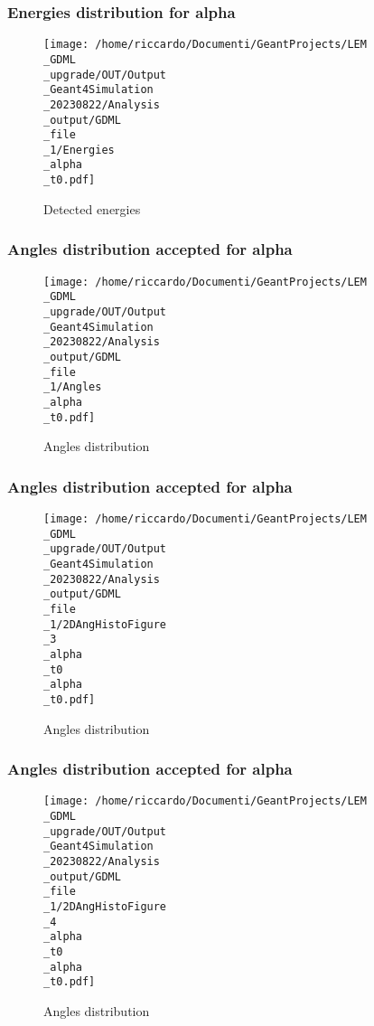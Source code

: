 \documentclass[8pt]{beamer}
\begin{document}
            \begin{frame}
                \frametitle{Energies distribution for alpha}
            
        \begin{figure}[h]
            \centering
            \texttt{[image: /home/riccardo/Documenti/GeantProjects/LEM\\\_GDML\\\_upgrade/OUT/Output\\\_Geant4Simulation\\\_20230822/Analysis\\\_output/GDML\\\_file\\\_1/Energies\\\_alpha\\\_t0.pdf]}
            \caption{Detected energies}
        \end{figure}
        
            \end{frame}
            
            \begin{frame}
                \frametitle{Angles distribution accepted for alpha}
            
        \begin{figure}[h]
            \centering
            \texttt{[image: /home/riccardo/Documenti/GeantProjects/LEM\\\_GDML\\\_upgrade/OUT/Output\\\_Geant4Simulation\\\_20230822/Analysis\\\_output/GDML\\\_file\\\_1/Angles\\\_alpha\\\_t0.pdf]}
            \caption{Angles distribution}
        \end{figure}
        
            \end{frame}
            
            \begin{frame}
                \frametitle{Angles distribution accepted for alpha}
            
        \begin{figure}[h]
            \centering
            \texttt{[image: /home/riccardo/Documenti/GeantProjects/LEM\\\_GDML\\\_upgrade/OUT/Output\\\_Geant4Simulation\\\_20230822/Analysis\\\_output/GDML\\\_file\\\_1/2DAngHistoFigure\\\_3\\\_alpha\\\_t0\\\_alpha\\\_t0.pdf]}
            \caption{Angles distribution}
        \end{figure}
        
            \end{frame}
            
            \begin{frame}
                \frametitle{Angles distribution accepted for alpha}
            
        \begin{figure}[h]
            \centering
            \texttt{[image: /home/riccardo/Documenti/GeantProjects/LEM\\\_GDML\\\_upgrade/OUT/Output\\\_Geant4Simulation\\\_20230822/Analysis\\\_output/GDML\\\_file\\\_1/2DAngHistoFigure\\\_4\\\_alpha\\\_t0\\\_alpha\\\_t0.pdf]}
            \caption{Angles distribution}
        \end{figure}
        
            \end{frame}
            
\end{document}
